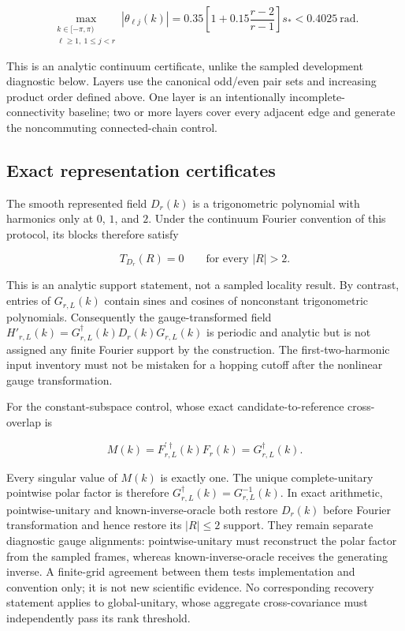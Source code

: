 \documentclass[11pt]{article}
\begin{document}
\[
\max_{\substack{k\in[-\pi,\pi)\\ \ell\geq1,\ 1\leq j<r}}
|\theta_{\ell j}(k)|
=0.35\left[1+0.15\frac{r-2}{r-1}\right]s_*<0.4025\ \mathrm{rad}.
\]

This is an analytic continuum certificate, unlike the sampled development diagnostic
below. Layers use the canonical odd/even pair sets and increasing product order defined
above. One layer is an intentionally incomplete-connectivity baseline; two or more
layers cover every adjacent edge and generate the noncommuting connected-chain control.

\subsection{Exact representation certificates}

The smooth represented field $D_r(k)$ is a trigonometric polynomial with harmonics only
at $0$, $1$, and $2$. Under the continuum Fourier convention of this protocol, its
blocks therefore satisfy

\[
T_{D_r}(R)=0\qquad\text{for every }|R|>2.
\]

This is an analytic support statement, not a sampled locality result. By contrast,
entries of $G_{r,L}(k)$ contain sines and cosines of nonconstant trigonometric
polynomials. Consequently the gauge-transformed field
$H'_{r,L}(k)=G_{r,L}^{\dagger}(k)D_r(k)G_{r,L}(k)$ is periodic and analytic but is not
assigned any finite Fourier support by the construction. The first-two-harmonic input
inventory must not be mistaken for a hopping cutoff after the nonlinear gauge transformation.

For the constant-subspace control, whose exact candidate-to-reference cross-overlap is

\[
M(k)=F_{r,L}^{\prime\dagger}(k)F_r(k)=G_{r,L}^{\dagger}(k).
\]

Every singular value of $M(k)$ is exactly one. The unique complete-unitary pointwise
polar factor is therefore $G_{r,L}^{\dagger}(k)=G_{r,L}^{-1}(k)$. In exact arithmetic,
pointwise-unitary and known-inverse-oracle both restore $D_r(k)$ before Fourier transformation and hence restore its
$|R|\leq2$ support. They remain separate diagnostic gauge alignments: pointwise-unitary must reconstruct the
polar factor from the sampled frames, whereas known-inverse-oracle receives the generating inverse. A
finite-grid agreement between them tests implementation and convention only; it is not
new scientific evidence. No corresponding recovery statement applies to global-unitary, whose
aggregate cross-covariance must independently pass its rank threshold.
\end{document}
